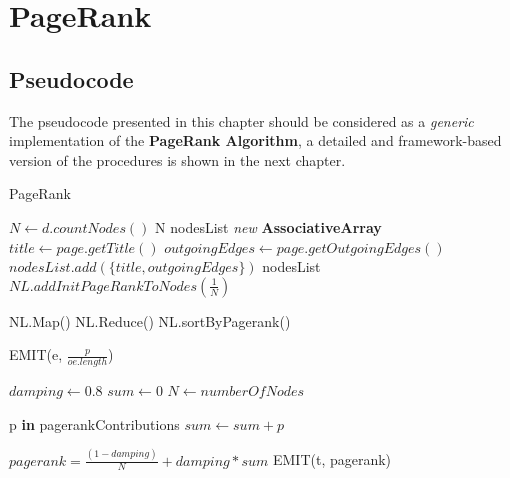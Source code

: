 \section{PageRank}

\subsection{Pseudocode}
The pseudocode presented in this chapter should be considered as a \textit{generic} implementation of the \textbf{PageRank Algorithm}, a detailed and framework-based version of the procedures is shown in the next chapter.

\begin{algorithm}[H]
	\caption{PageRank}\label{General}
		\begin{algorithmic}[1]
			
				\State $N \gets d.countNodes()$
				\State \Return N
			\EndProcedure
\newline			
				\State nodesList \textit{new} \textbf{AssociativeArray}
					\State $title \gets page.getTitle()$
					\State $outgoingEdges \gets page.getOutgoingEdges()$
					\State $nodesList.add(\{ title, outgoingEdges\}) $
				\EndFor
				\State \Return nodesList
			\EndProcedure
	\newline		
				\State $NL.addInitPageRankToNodes(\frac{1}{N})$
				
					\State NL.Map()
					\State NL.Reduce()
				\EndFor
				\State NL.sortByPagerank()
				
			\EndProcedure
\newline
					\State EMIT(e, $\frac{p}{oe.length}$)
				\EndFor
			\EndProcedure
						
				\State $damping \gets 0.8$
				\State $sum \gets 0$
				\State $N \gets numberOfNodes$
				
				\ForAll p \textbf{in} pagerankContributions
					\State $sum \gets sum + p$
				\EndFor
				
				\State $pagerank =  \frac{(1-damping)}{N} + damping*sum$
				\State EMIT(t, pagerank)
			\EndProcedure
	\end{algorithmic}
\end{algorithm}
